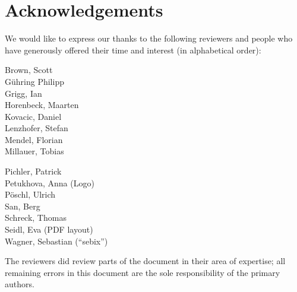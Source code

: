 \newpage
\section*{Acknowledgements}
\label{section:Reviewers}


We would like to express our thanks to the following reviewers and people who have generously offered their time and interest (in alphabetical order):


\vline{}

\begin{minipage}[b]{0.5\linewidth}
\center
Brown, Scott \\
G\"uhring Philipp  \\
Grigg, Ian  \\
Horenbeck, Maarten \\
Kovacic, Daniel \\
Lenzhofer, Stefan \\
Mendel, Florian \\
Millauer, Tobias \\
\end{minipage}
\begin{minipage}[b]{0.5\linewidth}
\center
Pichler, Patrick \\
Petukhova, Anna (Logo) \\
P\"oschl, Ulrich \\
San, Berg \\
Schreck, Thomas  \\
Seidl, Eva (PDF layout) \\
Wagner, Sebastian (``sebix'') \\
\end{minipage}

\vline{}

The reviewers did review parts of the document in their area of
expertise; all remaining errors in this document are the sole
responsibility of the primary authors.



